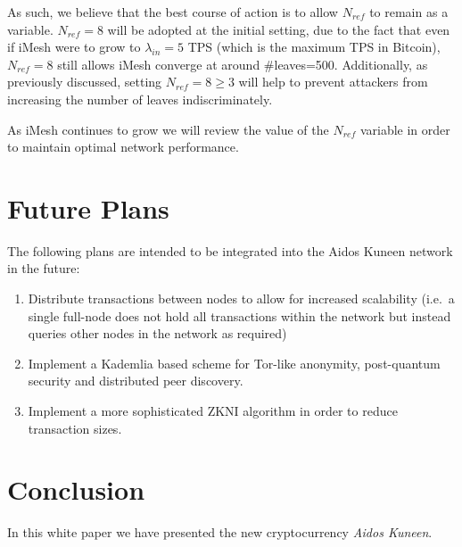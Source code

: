 \documentclass[a4paper,10pt,twocolumn]{article}
\begin{document}
	\vspace{2.5mm}
	
		 As such, we believe that the best course of action is to allow \( N_{ref}\) to remain as a variable. \( N_{ref}=8\) will be adopted at the initial setting, due to the fact that 
		 even if iMesh were to grow to \( \lambda_{in}=5\) TPS (which is the maximum TPS
		 in Bitcoin), \( N_{ref}=8\) still allows iMesh converge at around \#leaves=500. 
		 Additionally, as previously discussed, setting \( N_{ref}=8 \geq 3\) will
		 help to prevent attackers from increasing the number of leaves indiscriminately.
	
	\vspace{2.5mm}
		
		  As iMesh continues to grow we will review the value of the \( N_{ref}\) variable in order to maintain optimal network performance.
		  
	\section{Future Plans}
	\label{sec:future plans}
	
		The following plans are intended to be integrated into the Aidos Kuneen network in the future:
		 
	
		\vspace{-0.5\baselineskip}
		\begin{enumerate}
			\setlength\itemsep{0em}
		\item  Distribute transactions between nodes to allow for increased scalability (i.e.\ a single full-node does not hold all transactions 
		 within the network but instead queries other nodes in the network as required)
		\item Implement a Kademlia based scheme for Tor-like anonymity, post-quantum security and distributed peer discovery.
		\item Implement a more sophisticated ZKNI algorithm in order to reduce transaction sizes.
		\end{enumerate}
	
		  \section{Conclusion}
	\label{sec:conc}
	
	In this white paper we have presented the new cryptocurrency \emph{Aidos Kuneen}.
	
	\vspace{2.5mm}
	
\end{document}
